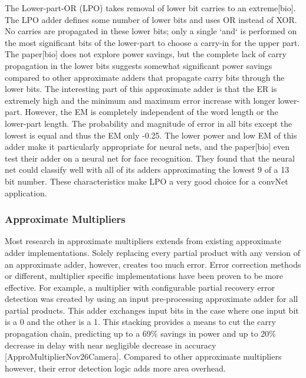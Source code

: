 \documentclass[journal]{IEEEtran}
\begin{document}
	\indent The Lower-part-OR (LPO) takes removal of lower bit carries to an extreme[bio]. The LPO adder defines some number of lower bits and uses OR instead of XOR. No carries are propagated in these lower bits; only a single `and` is performed on the most significant bits of the lower-part to choose a carry-in for the upper part. The paper[bio] does not explore power savings, but the complete lack of carry propagation in the lower bits suggests somewhat significant power savings compared to other approximate adders that propagate carry bits through the lower bits. The interesting part of this approximate adder is that the ER is extremely high and the minimum and maximum error increase with longer lower-part. However, the EM is completely independent of the word length or the lower-part length. The probability and magnitude of error in all bits except the lowest is equal and thus the EM only -0.25. The lower power and low EM of this adder make it particularly appropriate for neural nets, and the paper[bio] even test their adder on a neural net for face recognition. They found that the neural net could classify well with all of its adders approximating the lowest 9 of a 13 bit number. These characteristics make LPO a very good choice for a convNet application.\\
	  
	\subsubsection{Approximate Multipliers}
	\indent Most research in approximate multipliers extends from existing approximate adder implementations. Solely replacing every partial product with any version of an approximate adder, however, creates too much error. Error correction methods or different, multiplier specific implementations have been proven to be more effective. For example, a multiplier with configurable partial recovery error detection was created by using an input pre-processing approximate adder for all partial products. This adder exchanges input bits in the case where one input bit is a 0 and the other is a 1. This stacking provides a means to cut the carry propagation chain, predicting up to a 69\% savings in power and up to 20\% decrease in delay with near negligible decrease in accuracy  [ApproMultiplierNov26Camera]. Compared to other approximate multipliers however, their error detection logic adds more area overhead.\\
	
\end{document}
